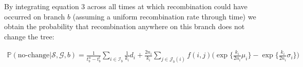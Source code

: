 \documentclass[11pt]{article}
\begin{document}

\noindent By integrating equation 3 across all times at which recombination could
have occurred on branch $b$ (assuming a uniform recombination rate through time) 
we obtain the probability that recombination anywhere on this branch does not 
change the tree:


\begin{equation}
\begin{aligned}
	\mathbb{P}(\textrm{no-change} | \mathcal{S},\mathcal{G},b) = 
	\frac{1}{t_b^u - t_b^l}
	\sum_{i \in \mathcal{I}_b} \frac{1}{k_i} d_i + 
	\frac{2n_i}{k_i} 
	\sum_{j \in \mathcal{J}_b(i)}f(i,j)
	\bigg(
		\exp\bigg\{\frac{k_i}{2n_i}\mu_i \bigg\} - 
		\exp\bigg\{\frac{k_i}{2n_i}\sigma_i \bigg\}
	\bigg)
\end{aligned}
\end{equation}
\end{document}
